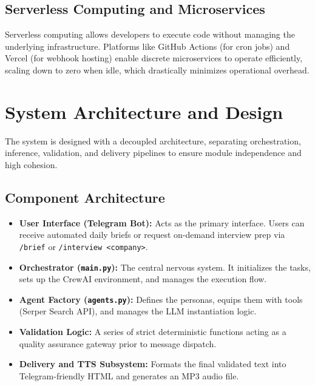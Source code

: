 \documentclass[conference]{IEEEtran}
\begin{document}
\subsection{Serverless Computing and Microservices}
Serverless computing allows developers to execute code without managing the underlying infrastructure. Platforms like GitHub Actions (for cron jobs) and Vercel (for webhook hosting) enable discrete microservices to operate efficiently, scaling down to zero when idle, which drastically minimizes operational overhead.

\section{System Architecture and Design}

The system is designed with a decoupled architecture, separating orchestration, inference, validation, and delivery pipelines to ensure module independence and high cohesion.

\subsection{Component Architecture}
\begin{itemize}
    \item \textbf{User Interface (Telegram Bot):} Acts as the primary interface. Users can receive automated daily briefs or request on-demand interview prep via \texttt{/brief} or \texttt{/interview <company>}.
    \item \textbf{Orchestrator (\texttt{main.py}):} The central nervous system. It initializes the tasks, sets up the CrewAI environment, and manages the execution flow.
    \item \textbf{Agent Factory (\texttt{agents.py}):} Defines the personas, equips them with tools (Serper Search API), and manages the LLM instantiation logic.
    \item \textbf{Validation Logic:} A series of strict deterministic functions acting as a quality assurance gateway prior to message dispatch.
    \item \textbf{Delivery and TTS Subsystem:} Formats the final validated text into Telegram-friendly HTML and generates an MP3 audio file.
\end{itemize}
\end{document}
